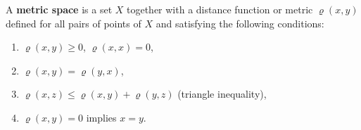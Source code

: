 A \textbf{metric space} is a set $X$ together with a distance function or metric $\varrho(x, y)$ defined for all pairs of points of $X$ and satisfying the following conditions:
\begin{enumerate}
\item $\varrho(x, y) \geq 0$, $\varrho(x, x) = 0$,
\item $\varrho(x, y) = \varrho(y, x)$,
\item $\varrho(x, z) \leq \varrho(x, y) + \varrho(y, z)$ (triangle inequality),
\item $\varrho(x, y) = 0$ implies $x = y$.
\end{enumerate}
